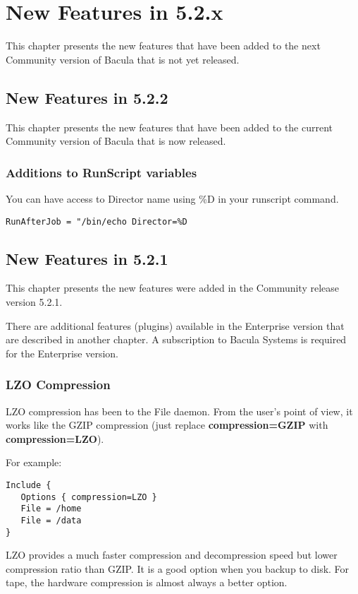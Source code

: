 \chapter{New Features in 5.2.x}
This chapter presents the new features that have been added to the next
Community version of Bacula that is not yet released.

\section{New Features in 5.2.2}
This chapter presents the new features that have been added to the current
Community version of Bacula that is now released.

\subsection{Additions to RunScript variables}
You can have access to Director name using \%D in your runscript
command.

\begin{verbatim}
RunAfterJob = "/bin/echo Director=%D 
\end{verbatim}

\section{New Features in 5.2.1}
This chapter presents the new features were added in the
Community release version 5.2.1.

There are additional features (plugins) available in the Enterprise version
that are described in another chapter. A subscription to Bacula Systems
is required for the Enterprise version.

\subsection{LZO Compression}

LZO compression has been to the File daemon. From the user's point of view,
it works like the GZIP compression (just replace {\bf compression=GZIP} with
{\bf compression=LZO}).

For example:
\begin{verbatim}
Include {
   Options { compression=LZO }
   File = /home
   File = /data
}
\end{verbatim}

LZO provides a much faster compression and decompression speed but lower
compression ratio than GZIP. It is a good option when you backup to disk. For
tape, the hardware compression is almost always a better option.

